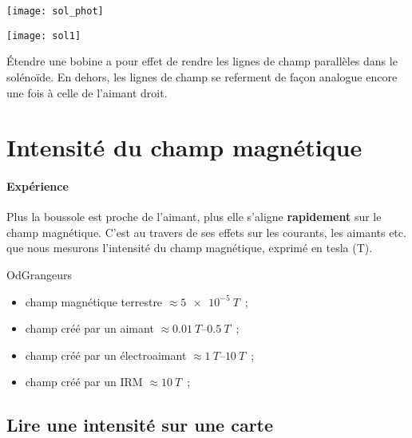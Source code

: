 \documentclass[../main/main.tex]{subfiles}
\begin{document}
\noindent
\begin{minipage}[c]{.5\linewidth}
  \centering
  \texttt{[image: sol\_phot]}
  \label{fig:solphot}
\end{minipage}
\hfill
\begin{minipage}[c]{.5\linewidth}
  \centering
  \texttt{[image: sol1]}
  \label{fig:sol1}
\end{minipage}

Étendre une bobine a pour effet de rendre les lignes de champ parallèles dans le
solénoïde. En dehors, les lignes de champ se referment de façon analogue encore
une fois à celle de l'aimant droit.

\section{Intensité du champ magnétique}
\label{sec:intchp}
\paragraph*{Expérience} Plus la boussole est proche de l'aimant, plus elle
s'aligne \textbf{rapidement} sur le champ magnétique. C'est au travers de ses
effets sur les courants, les aimants etc. que nous mesurons l'intensité du champ
magnétique, exprimé en tesla (\si{T}).
\begin{rexem}{OdGrangeurs}
  \begin{itemize}[label=$\diamond$, leftmargin=10pt]
    \item champ magnétique terrestre      $ \approx \SI{5e-5}{T} $~;
    \item champ créé par un aimant        $ \approx \SIrange{0.01}{0.5}{T} $~;
    \item champ créé par un électroaimant $ \approx \SIrange{1}{10}{T} $~;
    \item champ créé par un IRM           $ \approx \SI{10}{T} $~;
  \end{itemize}
\end{rexem}

\subsection{Lire une intensité sur une carte}
\end{document}
